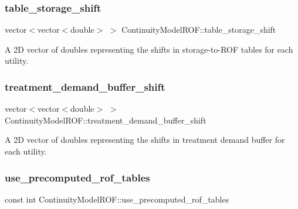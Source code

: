 \subsubsection{\texorpdfstring{table\+\_\+storage\+\_\+shift}{table\_storage\_shift}}
{\footnotesize\ttfamily vector$<$vector$<$double$>$ $>$ Continuity\+Model\+R\+O\+F\+::table\+\_\+storage\+\_\+shift\hspace{0.3cm}{\ttfamily [protected]}}



A 2D vector of doubles representing the shifts in storage-\/to-\/\+R\+OF tables for each utility. 

\mbox{\label{classContinuityModelROF_aedb1313e889617d718d2a93d719cb3f1}} 
\subsubsection{\texorpdfstring{treatment\+\_\+demand\+\_\+buffer\+\_\+shift}{treatment\_demand\_buffer\_shift}}
{\footnotesize\ttfamily vector$<$vector$<$double$>$ $>$ Continuity\+Model\+R\+O\+F\+::treatment\+\_\+demand\+\_\+buffer\+\_\+shift\hspace{0.3cm}{\ttfamily [protected]}}



A 2D vector of doubles representing the shifts in treatment demand buffer for each utility. 

\mbox{\label{classContinuityModelROF_a384967647c98d9768400de07e2bc7dab}} 
\subsubsection{\texorpdfstring{use\+\_\+precomputed\+\_\+rof\+\_\+tables}{use\_precomputed\_rof\_tables}}
{\footnotesize\ttfamily const int Continuity\+Model\+R\+O\+F\+::use\+\_\+precomputed\+\_\+rof\+\_\+tables\hspace{0.3cm}{\ttfamily [private]}}



